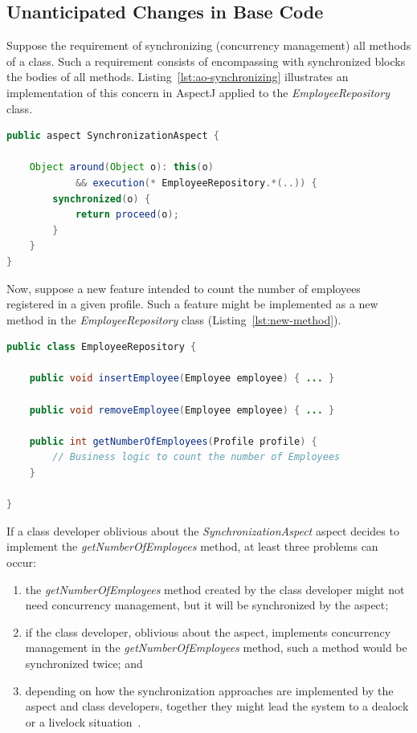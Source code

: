 \subsection{Unanticipated Changes in Base Code}

Suppose the requirement of synchronizing (concurrency management)
all methods of a class. Such a requirement consists of encompassing
with synchronized blocks the bodies of all methods.
Listing~\ref{lst:ao-synchronizing} illustrates an implementation of
this concern in AspectJ applied to the \emph{EmployeeRepository}
class.

\scriptsize
\begin{lstlisting}[frame=single, caption={Aspect responsible for implementing the concurrency concern.},label=lst:ao-synchronizing, language=Java]
public aspect SynchronizationAspect {

    Object around(Object o): this(o)
            && execution(* EmployeeRepository.*(..)) {
        synchronized(o) {
            return proceed(o);
        }
    }
}
\end{lstlisting}
\normalsize

Now, suppose a new feature intended to count the number of employees
registered in a given profile. Such a feature might be implemented as
a new method in the \emph{EmployeeRepository} class
(Listing~\ref{lst:new-method}).

\scriptsize
\begin{lstlisting}[frame=single, caption={A new method for counting the number of Employees.},label=lst:new-method, language=Java]
public class EmployeeRepository {

    public void insertEmployee(Employee employee) { ... }

    public void removeEmployee(Employee employee) { ... }

    public int getNumberOfEmployees(Profile profile) {
        // Business logic to count the number of Employees
    }

}
\end{lstlisting}
\normalsize

If a class developer oblivious about the
\emph{SynchronizationAspect} aspect decides to implement the
\emph{getNumberOfEmployees} method, at least three problems can
occur:

\begin{enumerate}

    \item the \emph{getNumberOfEmployees} method created by the class
    developer might not need concurrency management, but it will be
    synchronized by the aspect;

    \item if the class developer, oblivious about the aspect,
    implements concurrency management in the \emph{getNumberOfEmployees} method,
    such a method would be synchronized twice; and

    \item depending on how the synchronization approaches are implemented
    by the aspect and class developers, together they might lead the system
    to a dealock or a livelock situation~\cite{lea-java-coop-1999}.

\end{enumerate}

